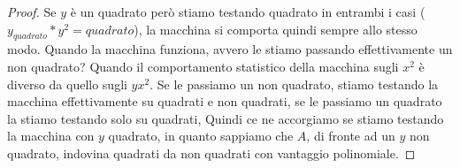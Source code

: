 \begin{proof}
Se $y$ è un quadrato però stiamo testando quadrato in entrambi i casi ($y_{quadrato} * y^2 = quadrato$), la macchina si comporta quindi sempre allo stesso modo. Quando la macchina funziona, avvero le stiamo passando effettivamente un non quadrato? Quando il comportamento statistico della macchina sugli $x^2$ è diverso da quello sugli $yx^2$. Se le passiamo un non quadrato, stiamo testando la macchina effettivamente su quadrati e non quadrati, se le passiamo un quadrato la stiamo testando solo su quadrati, Quindi ce ne accorgiamo se stiamo testando la macchina con $y$ quadrato, in quanto sappiamo che $A$, di fronte ad un $y$ non quadrato, indovina quadrati da non quadrati con vantaggio polinomiale. 
\end{proof}

